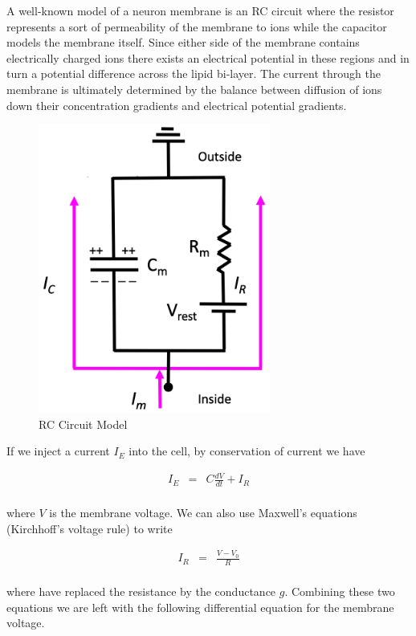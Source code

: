 \documentclass[a4paper,11pt]{book}
\begin{document}
A well-known model of a neuron membrane is an RC circuit where the resistor represents a sort of permeability of the membrane to ions while the capacitor models the membrane itself. Since either side of the membrane contains electrically charged ions there exists an electrical potential in these regions and in turn a potential difference across the lipid bi-layer. The current through the membrane is ultimately determined by the balance between diffusion of ions down their concentration gradients and electrical potential gradients. 

\begin{figure}
\centering
  \includegraphics[width=3in]{assets/circuit-model.png}
  \caption{RC Circuit Model}
  \label{fig:circuit}
\end{figure}

If we inject a current $I_{E}$ into the cell, by conservation of current we have

\begin{eqnarray*}
I_{E} &=& C\frac{dV}{dt} + I_{R}\\
\end{eqnarray*}

where $V$ is the membrane voltage. We can also use Maxwell's equations (Kirchhoff's voltage rule) to write

\begin{eqnarray*}
I_{R} &=& \frac{V-V_{0}}{R}\\
\end{eqnarray*}


where have replaced the resistance by the conductance $g$. Combining these two equations we are left with the following differential equation for the membrane voltage.
\end{document}
